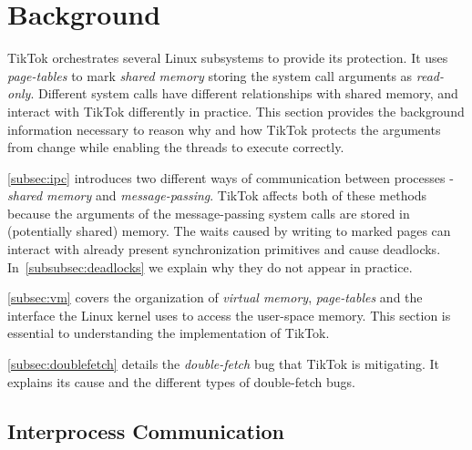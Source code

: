 \documentclass[conference]{IEEEtran}
\newcommand{\sysname}{TikTok}
\begin{document}
\section{Background}
\label{sec:background}

\sysname{} orchestrates several Linux subsystems to provide its protection. It
uses \emph{page-tables} to mark \emph{shared memory} storing the system call
arguments as \emph{read-only}. Different system calls have different
relationships with shared memory, and interact with \sysname{} differently in
practice. This section provides the background information necessary to reason
why and how \sysname{} protects the arguments from change while enabling the
threads to execute correctly.

\autoref{subsec:ipc} introduces two different ways of communication between
processes - \emph{shared memory} and \emph{message-passing}. \sysname{} affects
both of these methods because the arguments of the message-passing system calls
are stored in (potentially shared) memory. The waits caused by writing to marked
pages can interact with already present synchronization primitives and cause
deadlocks. In~\autoref{subsubsec:deadlocks} we explain why they do not appear in
practice.

\autoref{subsec:vm} covers the organization of \emph{virtual memory},
\emph{page-tables} and the interface the Linux kernel uses to access the
user-space memory. This section is essential to understanding the implementation
of \sysname.

\autoref{subsec:doublefetch} details the \emph{double-fetch} bug that \sysname{}
is mitigating. It explains its cause and the different types of double-fetch bugs.


\subsection{Interprocess Communication}
\label{subsec:ipc}
\end{document}
